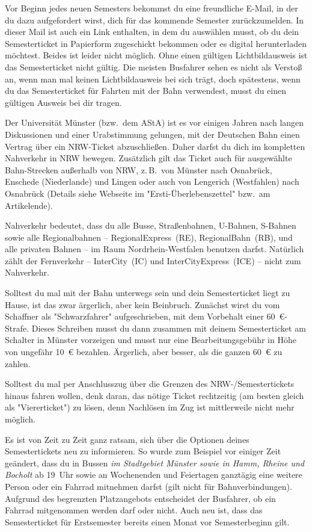 \begin{multicols*}{2}
Vor Beginn jedes neuen Semesters bekommst du eine freundliche E-Mail, in der du dazu aufgefordert wirst, dich für das kommende Semester zurückzumelden. In dieser Mail ist auch ein Link enthalten, in dem du auswählen musst, ob du dein Semesterticket in Papierform zugeschickt bekommen oder es digital herunterladen möchtest. Beides ist leider nicht möglich.
Ohne einen gültigen Lichtbildausweis ist das Semesterticket nicht gültig.
Die meisten Busfahrer sehen es nicht als Verstoß an, wenn man mal keinen Lichtbildausweis bei sich trägt, doch spätestens, wenn du das Semesterticket für Fahrten mit der Bahn verwendest, musst du einen gültigen Ausweis bei dir tragen.

Der Universität Münster (bzw.\ dem AStA) ist es vor einigen Jahren nach langen Diskussionen und einer Urabstimmung gelungen, mit der Deutschen Bahn einen Vertrag über ein NRW-Ticket abzuschließen.
Daher darfst du dich im kompletten Nahverkehr in NRW bewegen.
Zusätzlich gilt das Ticket auch für ausgewählte Bahn-Strecken außerhalb von NRW, z.\,B.\ von Münster nach Osnabrück, Enschede (Niederlande) und Lingen oder auch von Lengerich (Westfahlen) nach Osnabrück (Details siehe Webseite im "Ersti-Überlebenszettel" bzw.\ am Artikelende).

Nahverkehr bedeutet, dass du alle Busse, Straßenbahnen, U-Bahnen, S-Bahnen sowie alle Regionalbahnen -- RegionalExpress~(RE), RegionalBahn~(RB), und alle privaten Bahnen -- im Raum Nordrhein-Westfalen benutzen darfst.
Natürlich zählt der Fernverkehr -- InterCity~(IC) und InterCityExpress~(ICE) -- nicht zum Nahverkehr.

Solltest du mal mit der Bahn unterwegs sein und dein Semesterticket liegt zu Hause, ist das zwar ärgerlich, aber kein Beinbruch.
Zunächst wirst du vom Schaffner als "Schwarzfahrer" aufgeschrieben, mit dem Vorbehalt einer \SI{60}{\euro}-Strafe.
Dieses Schreiben musst du dann zusammen mit deinem Semesterticket am Schalter in Münster vorzeigen und musst nur eine Bearbeitungsgebühr in Höhe von ungefähr \SI{10}{\euro} bezahlen.
Ärgerlich, aber besser, als die ganzen \SI{60}{\euro} zu zahlen.

Solltest du mal per Anschlusszug über die Grenzen des NRW-/Semestertickets hinaus fahren wollen, denk daran, das nötige Ticket rechtzeitig (am besten gleich als "Viererticket") zu lösen, denn Nachlösen im Zug ist mittlerweile nicht mehr möglich.

Es ist von Zeit zu Zeit ganz ratsam, sich über die Optionen deines Semestertickets neu zu informieren.
So wurde zum Beispiel vor einiger Zeit geändert, dass du in Bussen \emph{im Stadtgebiet Münster sowie in Hamm, Rheine und Bocholt} ab 19~Uhr sowie an Wochenenden und Feiertagen ganztägig eine weitere Person oder ein Fahrrad mitnehmen darfst (gilt nicht für Bahnverbindungen).
Aufgrund des begrenzten Platzangebots entscheidet der Busfahrer, ob ein Fahrrad mitgenommen werden darf oder nicht.
Auch neu ist, dass das Semesterticket für Erstsemester bereits einen Monat vor Semesterbeginn gilt.


\end{multicols*}
